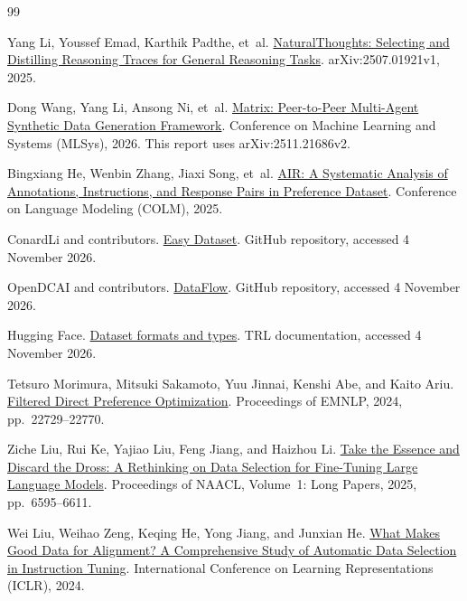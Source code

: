 \begin{thebibliography}{99}
\small
\setlength{\itemsep}{4pt}

Yang Li, Youssef Emad, Karthik Padthe, et~al.
\href{https://arxiv.org/abs/2507.01921v1}{NaturalThoughts: Selecting and Distilling Reasoning Traces for General Reasoning Tasks}.
arXiv:2507.01921v1, 2025.

Dong Wang, Yang Li, Ansong Ni, et~al.
\href{https://arxiv.org/abs/2511.21686v2}{Matrix: Peer-to-Peer Multi-Agent Synthetic Data Generation Framework}.
Conference on Machine Learning and Systems (MLSys), 2026. This report uses arXiv:2511.21686v2.

Bingxiang He, Wenbin Zhang, Jiaxi Song, et~al.
\href{https://openreview.net/pdf?id=Sz3ZU6oeVJ}{AIR: A Systematic Analysis of Annotations, Instructions, and Response Pairs in Preference Dataset}.
Conference on Language Modeling (COLM), 2025.

ConardLi and contributors.
\href{https://github.com/ConardLi/easy-dataset}{Easy Dataset}.
GitHub repository, accessed 4 November 2026.

OpenDCAI and contributors.
\href{https://github.com/OpenDCAI/DataFlow}{DataFlow}.
GitHub repository, accessed 4 November 2026.

Hugging Face.
\href{https://huggingface.co/docs/trl/en/dataset_formats}{Dataset formats and types}.
TRL documentation, accessed 4 November 2026.

Tetsuro Morimura, Mitsuki Sakamoto, Yuu Jinnai, Kenshi Abe, and Kaito Ariu.
\href{https://aclanthology.org/2024.emnlp-main.1266/}{Filtered Direct Preference Optimization}.
Proceedings of EMNLP, 2024, pp.~22729--22770.

Ziche Liu, Rui Ke, Yajiao Liu, Feng Jiang, and Haizhou Li.
\href{https://aclanthology.org/2025.naacl-long.336/}{Take the Essence and Discard the Dross: A Rethinking on Data Selection for Fine-Tuning Large Language Models}.
Proceedings of NAACL, Volume~1: Long Papers, 2025, pp.~6595--6611.

Wei Liu, Weihao Zeng, Keqing He, Yong Jiang, and Junxian He.
\href{https://openreview.net/forum?id=BTKAeLqLMw}{What Makes Good Data for Alignment? A Comprehensive Study of Automatic Data Selection in Instruction Tuning}.
International Conference on Learning Representations (ICLR), 2024.


\end{thebibliography}
